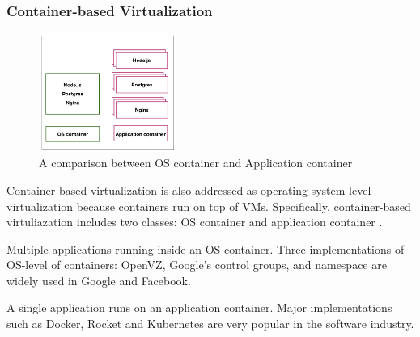 
\subsubsection{Container-based Virtualization} 

\begin{figure}
	\centering
	\includegraphics[width=0.4\textwidth]{pics/container_OS_APP.png}
	\caption{A comparison between OS container and Application container \cite{Piraghaj:2017vi}}
	\label{fig:comparison_container}
\end{figure}

 Container-based virtualization is also addressed as operating-system-level virtualization because containers run on top of VMs. Specifically, container-based virtuliazation includes two classes: OS container and application container \cite{Piraghaj:2017vi}. 

Multiple applications running inside an OS container. Three implementations of OS-level of containers: OpenVZ, Google's control groups, and namespace \cite{Rosen:2013wt} are widely used in Google and Facebook.

 A single application runs on an application container. Major implementations such as Docker, Rocket and Kubernetes \cite{Bernstein:2014ur} are very popular in the software industry. 

